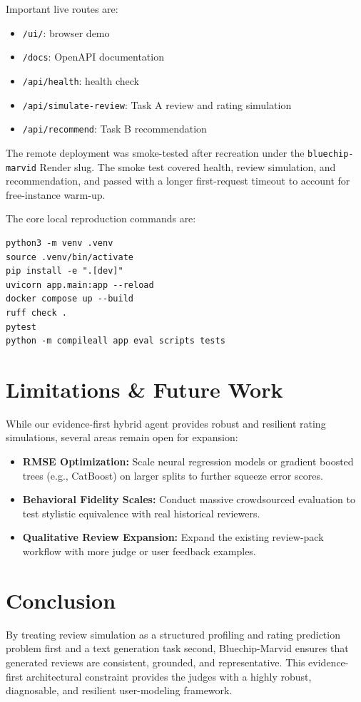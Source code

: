 \documentclass[11pt,a4paper]{article}
\begin{document}
Important live routes are:
\begin{itemize}
    \item \texttt{/ui/}: browser demo
    \item \texttt{/docs}: OpenAPI documentation
    \item \texttt{/api/health}: health check
    \item \texttt{/api/simulate-review}: Task A review and rating simulation
    \item \texttt{/api/recommend}: Task B recommendation
\end{itemize}

The remote deployment was smoke-tested after recreation under the \texttt{bluechip-marvid} Render slug. The smoke test covered health, review simulation, and recommendation, and passed with a longer first-request timeout to account for free-instance warm-up.

The core local reproduction commands are:
\begin{verbatim}
python3 -m venv .venv
source .venv/bin/activate
pip install -e ".[dev]"
uvicorn app.main:app --reload
docker compose up --build
ruff check .
pytest
python -m compileall app eval scripts tests
\end{verbatim}

\section{Limitations \& Future Work}
While our evidence-first hybrid agent provides robust and resilient rating simulations, several areas remain open for expansion:
\begin{itemize}
    \item \textbf{RMSE Optimization:} Scale neural regression models or gradient boosted trees (e.g., CatBoost) on larger splits to further squeeze error scores.
    \item \textbf{Behavioral Fidelity Scales:} Conduct massive crowdsourced evaluation to test stylistic equivalence with real historical reviewers.
    \item \textbf{Qualitative Review Expansion:} Expand the existing review-pack workflow with more judge or user feedback examples.
\end{itemize}

\section{Conclusion}
By treating review simulation as a structured profiling and rating prediction problem first and a text generation task second, Bluechip-Marvid ensures that generated reviews are consistent, grounded, and representative. This evidence-first architectural constraint provides the judges with a highly robust, diagnosable, and resilient user-modeling framework.
\end{document}
